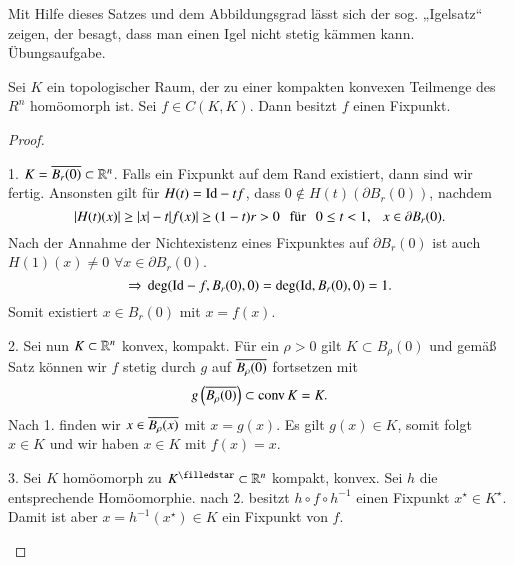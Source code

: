 \begin{remark}
    Mit Hilfe dieses Satzes und dem Abbildungsgrad lässt sich der sog. „Igelsatz“ zeigen, der besagt,
    dass man einen Igel nicht stetig kämmen kann. Übungsaufgabe. 
\end{remark}

\begin{theorem}\label{2.13}
    Sei $K$ ein topologischer Raum, der zu einer kompakten konvexen Teilmenge des $R^n$ homöomorph ist.
    Sei $f\in C(K,K)$. Dann besitzt $f$ einen Fixpunkt.
\end{theorem}

\begin{proof}
    \begin{description}
    \item{1.}
    $K=\overline{B_r(0)}\subset\mathbb{R}^n$. Falls ein Fixpunkt auf dem Rand existiert, dann sind wir fertig.
    Ansonsten gilt für $H(t)=\mathrm{Id}-tf$, dass $0\nin H(t)(\partial B_r(0))$, nachdem
    \[
        |H(t)(x)|\geq |x|-t|f(x)|\geq (1-t)r>0 \hspace{.25cm} \text{für} \hspace{.25cm} 0\leq t< 1, \hspace{.25cm} x\in\partial B_r(0).
    \]
    Nach der Annahme der Nichtexistenz eines Fixpunktes auf $\partial B_r(0)$ ist auch $H(1)(x)\neq 0$
    $\forall x \in \partial B_r(0)$.
    \[
        \Rightarrow \, \deg(\mathrm{Id}-f,B_r(0),0)=\deg(\mathrm{Id},B_r(0),0)=1.
    \]
    Somit existiert $x\in B_r(0)$ mit $x=f(x)$.
    \item{2.}
    Sei nun $K\subset \mathbb{R}^n$ konvex, kompakt. Für ein $\rho>0$ gilt $K\subset B_\rho(0)$ und gemäß Satz
    \label{2.12} können wir $f$ stetig durch $g$ auf $\overline{B_{\rho}(0)}$ fortsetzen mit
    \[
        g\left( \overline{B_\rho (0)} \right)\subset \mathrm{conv} \, K=K.
    \]
    Nach 1. finden wir $x\in \overline{B_\rho(x)}$ mit $x=g(x)$.
    Es gilt $g(x)\in K$, somit folgt $x\in K$ und wir haben $x \in K$ mit $f(x)=x$.
    \item{3.}
    Sei $K$ homöomorph zu $K^\star \subset \R^n$ kompakt, konvex. Sei $h$ die entsprechende Homöomorphie.
    nach 2. besitzt $h\circ f \circ h^{-1}$ einen Fixpunkt $x^\star\in K^\star$. Damit ist aber $x=h^{-1}
    (x^\star)\in K$ ein Fixpunkt von $f$.
    \end{description}
    \[ \]
\end{proof}

